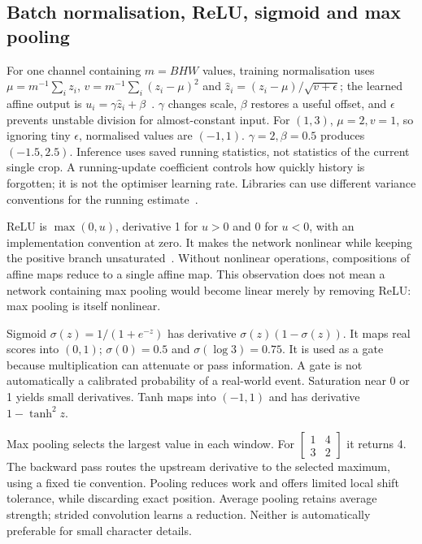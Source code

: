 \subsection{Batch normalisation, ReLU, sigmoid and max pooling}
For one channel containing $m=BHW$ values, training normalisation uses
$\mu=m^{-1}\sum_i z_i$, $v=m^{-1}\sum_i(z_i-\mu)^2$ and
$\hat z_i=(z_i-\mu)/\sqrt{v+\epsilon}$; the learned affine output is
$u_i=\gamma\hat z_i+\beta$~\cite{ioffe2015}.
$\gamma$ changes scale, $\beta$ restores a useful offset, and $\epsilon$
prevents unstable division for almost-constant input. For $(1,3)$,
$\mu=2,v=1$, so ignoring tiny $\epsilon$, normalised values are $(-1,1)$.
$\gamma=2,\beta=0.5$ produces $(-1.5,2.5)$.
Inference uses saved running statistics, not statistics of the current single
crop. A running-update coefficient controls how quickly history is forgotten;
it is not the optimiser learning rate. Libraries can use different variance
conventions for the running estimate~\cite{torchbn}.

ReLU is $\max(0,u)$, derivative 1 for $u>0$ and 0 for $u<0$, with an
implementation convention at zero. It makes the network nonlinear while
keeping the positive branch unsaturated~\cite{glorotrect}. Without nonlinear
operations, compositions of affine maps reduce to a single affine map.
This observation does not mean a network containing max pooling would become
linear merely by removing ReLU: max pooling is itself nonlinear.

Sigmoid $\sigma(z)=1/(1+e^{-z})$ has derivative $\sigma(z)(1-\sigma(z))$.
It maps real scores into $(0,1)$; $\sigma(0)=0.5$ and
$\sigma(\log3)=0.75$. It is used as a gate because multiplication can
attenuate or pass information. A gate is not automatically a calibrated
probability of a real-world event. Saturation near 0 or 1 yields small
derivatives. Tanh maps into $(-1,1)$ and has derivative $1-\tanh^2z$.

Max pooling selects the largest value in each window. For
$\left[\begin{smallmatrix}1&4\\3&2\end{smallmatrix}\right]$ it returns 4.
The backward pass routes the upstream derivative to the selected maximum,
using a fixed tie convention. Pooling reduces work and offers limited local
shift tolerance, while discarding exact position. Average pooling retains
average strength; strided convolution learns a reduction. Neither is
automatically preferable for small character details.

